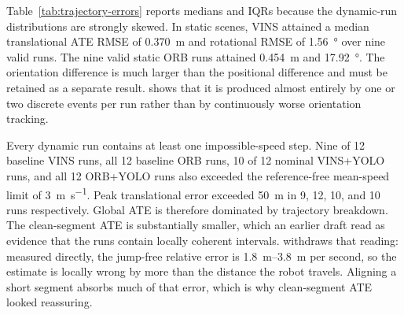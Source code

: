 Table~\ref{tab:trajectory-errors} reports medians and IQRs because the dynamic-run
distributions are strongly skewed. In static scenes, VINS attained a median
translational ATE RMSE of \SI{0.370}{\metre} and rotational RMSE of
\SI{1.56}{\degree} over nine valid runs. The nine valid static ORB runs attained
\SI{0.454}{\metre} and \SI{17.92}{\degree}. The orientation difference is much
larger than the positional difference and must be retained as a separate result.
 shows that it is produced almost entirely by one or two discrete
events per run rather than by continuously worse orientation tracking.

\begin{table}[htbp]
\centering
\caption{Trajectory error against rosbag ground truth, median (IQR). ``Clean'' is
ATE RMSE after independently aligning the longest segment without an implied
speed above \SI{10}{\metre\per\second}. Requested VINS+YOLO values are not
active-filter measurements.}
\label{tab:trajectory-errors}
\end{table}

Every dynamic run contains at least one impossible-speed step. Nine of 12
baseline VINS runs, all 12 baseline ORB runs, 10 of 12 nominal VINS+YOLO runs,
and all 12 ORB+YOLO runs also exceeded the reference-free mean-speed limit of
\SI{3}{\metre\per\second}. Peak translational error exceeded \SI{50}{\metre} in
9, 12, 10, and 10 runs respectively. Global ATE is therefore dominated by
trajectory breakdown. The clean-segment ATE is substantially smaller, which an
earlier draft read as evidence that the runs contain locally coherent intervals.
 withdraws that reading: measured directly, the jump-free
relative error is \SIrange{1.8}{3.8}{\metre} per second, so the estimate is
locally wrong by more than the distance the robot travels. Aligning a short
segment absorbs much of that error, which is why clean-segment ATE looked
reassuring.

